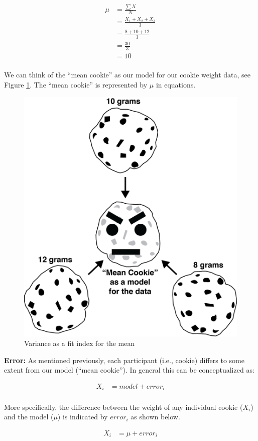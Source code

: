 \documentclass[
]{krantz}
\begin{document}
\[
\begin{aligned} 
\mu &= \frac{\sum{X}}{N} \\
&= \frac{X_1 + X_2 + X_3}{3}\\ 
&= \frac{8 + 10 + 12}{3}\\
&= \frac{30}{3}\\
&= 10\\
\end{aligned} 
\]

We can think of the ``mean cookie'' as our model for our cookie weight data, see Figure \ref{fig:meancookie}. The ``mean cookie'' is represented by \(\mu\) in equations.

\begin{figure}
\includegraphics[width=0.6\linewidth]{ch_populations/images/cookie} \caption{Variance as a fit index for the mean}\label{fig:meancookie}
\end{figure}

\textbf{Error:} As mentioned previously, each participant (i.e., cookie) differs to some extent from our model (``mean cookie''). In general this can be conceptualized as:

\[
\begin{aligned} 
X_i &= model + error_i \\
\end{aligned} 
\]

More specifically, the difference between the weight of any individual cookie (\(X_i\)) and the model (\(\mu\)) is indicated by \(error_i\) as shown below.

\[
\begin{aligned} 
X_i &= \mu + error_i \\
\end{aligned} 
\]
\end{document}
